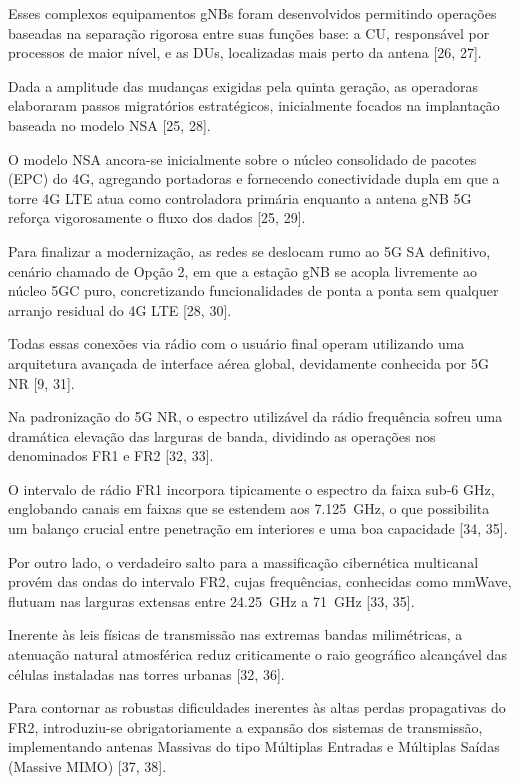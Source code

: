 Esses complexos equipamentos \glspl{gNB} foram desenvolvidos permitindo operações baseadas na separação rigorosa entre suas funções base: a \gls{CU}, responsável por processos de maior nível, e as \glspl{DU}, localizadas mais perto da antena [26, 27].

Dada a amplitude das mudanças exigidas pela quinta geração, as operadoras elaboraram passos migratórios estratégicos, inicialmente focados na implantação baseada no modelo \gls{NSA} [25, 28].

O modelo \gls{NSA} ancora-se inicialmente sobre o núcleo consolidado de pacotes (\gls{EPC}) do \gls{4G}, agregando portadoras e fornecendo conectividade dupla em que a torre \gls{4G} \gls{LTE} atua como controladora primária enquanto a antena \gls{gNB} \gls{5G} reforça vigorosamente o fluxo dos dados [25, 29].

Para finalizar a modernização, as redes se deslocam rumo ao \gls{5G} \gls{SA} definitivo, cenário chamado de Opção 2, em que a estação \gls{gNB} se acopla livremente ao núcleo \gls{5GC} puro, concretizando funcionalidades de ponta a ponta sem qualquer arranjo residual do \gls{4G} \gls{LTE} [28, 30].

Todas essas conexões via rádio com o usuário final operam utilizando uma arquitetura avançada de interface aérea global, devidamente conhecida por \gls{5G} \gls{NR} [9, 31].

Na padronização do \gls{5G} \gls{NR}, o espectro utilizável da rádio frequência sofreu uma dramática elevação das larguras de banda, dividindo as operações nos denominados \gls{FR1} e \gls{FR2} [32, 33].

O intervalo de rádio \gls{FR1} incorpora tipicamente o espectro da faixa sub-6 GHz, englobando canais em faixas que se estendem aos 7.125~GHz, o que possibilita um balanço crucial entre penetração em interiores e uma boa capacidade [34, 35].

Por outro lado, o verdadeiro salto para a massificação cibernética multicanal provém das ondas do intervalo \gls{FR2}, cujas frequências, conhecidas como \gls{mmWave}, flutuam nas larguras extensas entre 24.25~GHz a 71~GHz [33, 35].

Inerente às leis físicas de transmissão nas extremas bandas milimétricas, a atenuação natural atmosférica reduz criticamente o raio geográfico alcançável das células instaladas nas torres urbanas [32, 36].

Para contornar as robustas dificuldades inerentes às altas perdas propagativas do \gls{FR2}, introduziu-se obrigatoriamente a expansão dos sistemas de transmissão, implementando antenas Massivas do tipo Múltiplas Entradas e Múltiplas Saídas (Massive \gls{MIMO}) [37, 38].

